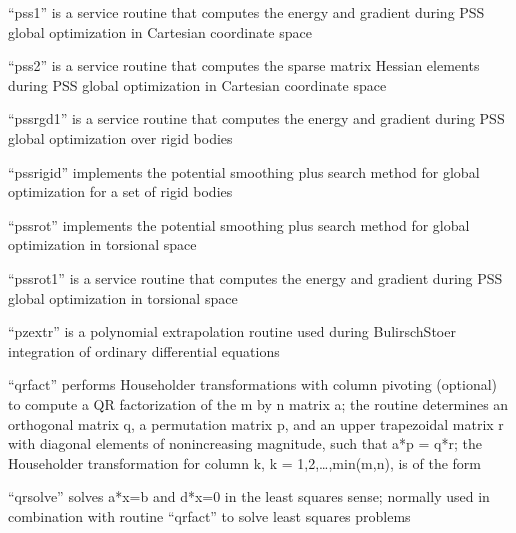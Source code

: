 \documentclass[letterpaper,11pt,english]{sphinxmanual}
\begin{document}
“pss1” is a service routine that computes the energy and gradient during PSS global optimization in Cartesian coordinate space


“pss2” is a service routine that computes the sparse matrix Hessian elements during PSS global optimization in Cartesian coordinate space


“pssrgd1” is a service routine that computes the energy and gradient during PSS global optimization over rigid bodies


“pssrigid” implements the potential smoothing plus search method for global optimization for a set of rigid bodies


“pssrot” implements the potential smoothing plus search method for global optimization in torsional space


“pssrot1” is a service routine that computes the energy and gradient during PSS global optimization in torsional space




“pzextr” is a polynomial extrapolation routine used during Bulirsch\sphinxhyphen{}Stoer integration of ordinary differential equations


“qrfact” performs Householder transformations with column pivoting (optional) to compute a QR factorization of the m by n matrix a; the routine determines an orthogonal matrix q, a permutation matrix p, and an upper trapezoidal matrix r with diagonal elements of nonincreasing magnitude, such that a*p = q*r; the Householder transformation for column k, k = 1,2,…,min(m,n), is of the form


“qrsolve” solves a*x=b and d*x=0 in the least squares sense; normally used in combination with routine “qrfact” to solve least squares problems

\end{document}
